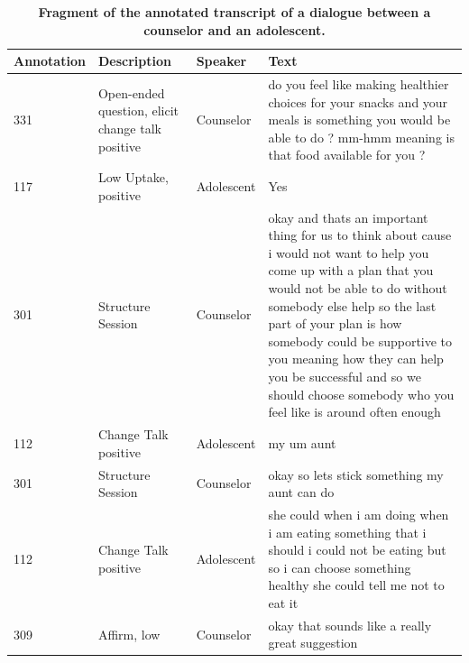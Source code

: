 \documentclass{amia}
\begin{document}
\begin{table}[htb]
\caption{\textbf{Fragment of the annotated transcript of a dialogue between a counselor and an adolescent.}}    
\label{table:06}
\centering
\begin{tabular}{lp{3.6cm}lp{8cm}}
\hline
\hline
Annotation  & Description & Speaker & Text \\
\hline
331 &	Open-ended question, elicit change talk positive &	Counselor &	do you feel like making healthier choices for your snacks and your meals is something you would be able to do ? mm-hmm meaning is that food available for you ? \\
117 &	Low Uptake, positive	& Adolescent &	Yes \\
301 &	Structure Session	& Counselor &	okay and thats an important thing for us to think about cause i would not want to help you come up with a plan that you would not be able to do without somebody else help so the last part of your plan is how somebody could be supportive to you meaning how they can help you be successful and so we should choose somebody who you feel like is around often enough \\
112 &	Change Talk positive	& Adolescent &	my um aunt \\
301 &	Structure Session	& Counselor &	okay so lets stick something my aunt can do \\
112 &	Change Talk positive &	Adolescent &	she could when i am doing when i am eating something that i should i could not be eating but so i can choose something healthy she could tell me not to eat it \\
309 &	Affirm, low &	Counselor &	okay that sounds like a really great suggestion \\
\hline
\hline
\end{tabular}
\end{table}
\end{document}
